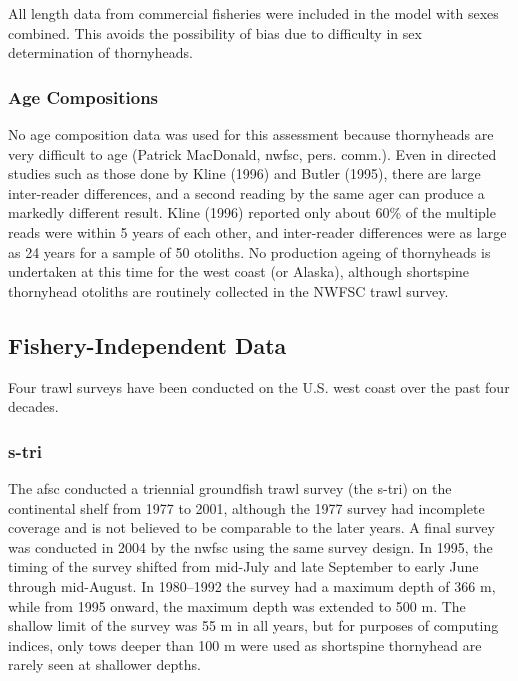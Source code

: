 \documentclass[11pt,
  english,
  letterpaper,
]{article}
\begin{document}
All length data from commercial fisheries were included in the model with sexes combined. This avoids the possibility of bias due to difficulty in sex determination of thornyheads.

\hypertarget{age-compositions}{%
\subsubsection{Age Compositions}\label{age-compositions}}

No age composition data was used for this assessment because thornyheads are very difficult to age (Patrick MacDonald, \gls{nwfsc}, pers. comm.). Even in directed studies such as those done by Kline (1996) and Butler (1995), there are large inter-reader differences, and a second reading by the same ager can produce a markedly different result. Kline (1996) reported only about 60\% of the multiple reads were within 5 years of each other, and inter-reader differences were as large as 24 years for a sample of 50 otoliths. No production ageing of thornyheads is undertaken at this time for the west coast (or Alaska), although shortspine thornyhead otoliths are routinely collected in the NWFSC trawl survey.

\hypertarget{fishery-independent-data}{%
\subsection{Fishery-Independent Data}\label{fishery-independent-data}}

Four trawl surveys have been conducted on the U.S. west coast over the past four decades.

\hypertarget{section}{%
\subsubsection{\texorpdfstring{\acrlong{s-tri}}{}}\label{section}}

The \gls{afsc} conducted a triennial groundfish trawl survey (the \Gls{s-tri}) on the continental shelf from 1977 to 2001, although the 1977 survey had incomplete coverage and is not believed to be comparable to the later years. A final survey was conducted in 2004 by the \gls{nwfsc} using the same survey design. In 1995, the timing of the survey shifted from mid-July and late September to early June through mid-August. In 1980--1992 the survey had a maximum depth of 366 m, while from 1995 onward, the maximum depth was extended to 500 m. The shallow limit of the survey was 55 m in all years, but for purposes of computing indices, only tows deeper than 100 m were used as shortspine thornyhead are rarely seen at shallower depths.
\end{document}
